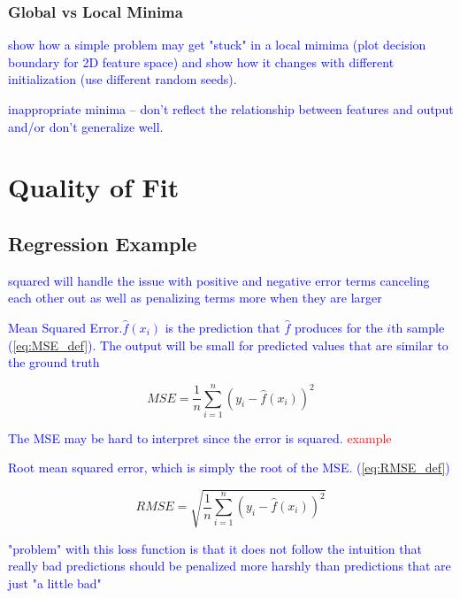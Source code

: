 \subsubsection{Global vs Local Minima}

\textcolor{blue}{show how a simple problem may get "stuck" in a local mimima (plot decision boundary for 2D feature space) and show how it changes with different initialization (use different random seeds). }

\textcolor{blue}{{inappropriate minima} -- don't reflect the relationship between features and output and/or don't generalize well.}

\section{Quality of Fit}


\subsection{Regression Example}


\textcolor{blue}{squared will handle the issue with positive and negative error terms canceling each other out as well as penalizing terms more when they are larger}

\textcolor{blue}{Mean Squared Error.$\hat{f}(x_i)$ is the prediction that $\hat{f}$ produces for the $i$th sample (\ref{eq:MSE_def}). The output will be small for predicted values that are similar to the ground truth}

\begin{equation}
{MSE = \frac{1}{n}\sum_{i=1}^{n}(y_i - \hat{f}(x_i))^2}
\label{eq:MSE_def}
\end{equation}

\textcolor{blue}{The MSE may be hard to interpret since the error is squared. \textcolor{red}{example}}

\textcolor{blue}{Root mean squared error, which is simply the root of the MSE. (\ref{eq:RMSE_def})}

\begin{equation}
{RMSE = \sqrt{\frac{1}{n}\sum_{i=1}^{n}(y_i - \hat{f}(x_i))^2}}
\label{eq:RMSE_def}
\end{equation}

\textcolor{blue}{"problem" with this loss function is that it does not follow the intuition that really bad predictions should be penalized more harshly than predictions that are just "a little bad"}

